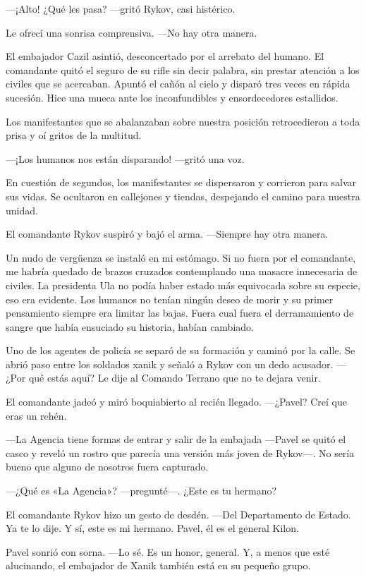 —¡Alto! ¿Qué les pasa? —gritó Rykov, casi histérico.

Le ofrecí una sonrisa comprensiva. —No hay otra manera.

El embajador Cazil asintió, desconcertado por el arrebato del humano. El comandante quitó el seguro de su rifle sin decir palabra, sin prestar atención a los civiles que se acercaban. Apuntó el cañón al cielo y disparó tres veces en rápida sucesión. Hice una mueca ante los inconfundibles y ensordecedores estallidos.

Los manifestantes que se abalanzaban sobre nuestra posición retrocedieron a toda prisa y oí gritos de la multitud.

—¡Los humanos nos están disparando! —gritó una voz.

En cuestión de segundos, los manifestantes se dispersaron y corrieron para salvar sus vidas. Se ocultaron en callejones y tiendas, despejando el camino para nuestra unidad.

El comandante Rykov suspiró y bajó el arma. —Siempre hay otra manera.

Un nudo de vergüenza se instaló en mi estómago. Si no fuera por el comandante, me habría quedado de brazos cruzados contemplando una masacre innecesaria de civiles. La presidenta Ula no podía haber estado más equivocada sobre su especie, eso era evidente. Los humanos no tenían ningún deseo de morir y su primer pensamiento siempre era limitar las bajas. Fuera cual fuera el derramamiento de sangre que había ensuciado su historia, habían cambiado.

Uno de los agentes de policía se separó de su formación y caminó por la calle. Se abrió paso entre los soldados xanik y señaló a Rykov con un dedo acusador. —¿Por qué estás aquí? Le dije al Comando Terrano que no te dejara venir.

El comandante jadeó y miró boquiabierto al recién llegado. —¿Pavel? Creí que eras un rehén.

—La Agencia tiene formas de entrar y salir de la embajada —Pavel se quitó el casco y reveló un rostro que parecía una versión más joven de Rykov—. No sería bueno que alguno de nosotros fuera capturado.

 —¿Qué es «La Agencia»? —pregunté—. ¿Este es tu hermano?

El comandante Rykov hizo un gesto de desdén. —Del Departamento de Estado. Ya te lo dije. Y sí, este es mi hermano. Pavel, él es el general Kilon.

Pavel sonrió con sorna. —Lo sé. Es un honor, general. Y, a menos que esté alucinando, el embajador de Xanik también está en su pequeño grupo.

